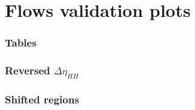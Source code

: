 \chapter{Flows validation plots}

\def\baseTag{_deta_uo}


\subsection{Tables}
\label{subapp:tables}


%
%
%
%
%
%

%		




\FloatBarrier
\clearpage
\subsection{Reversed \texorpdfstring{ $\Delta \eta_{HH}$}{Lg}}
\label{subapp:rev_deta}

\def\valreg{rev_deta}
\def\vallabel{reversed $\Delta \eta_{HH}$}


\FloatBarrier

\subsection{Shifted regions}
\label{subapp:shifted-regs}

\def\valreg{LL}
\def\vallabel{lower left SR}


\FloatBarrier


\def\valreg{LR}
\def\vallabel{lower right SR}


\FloatBarrier


\def\valreg{UR}
\def\vallabel{upper right SR}

